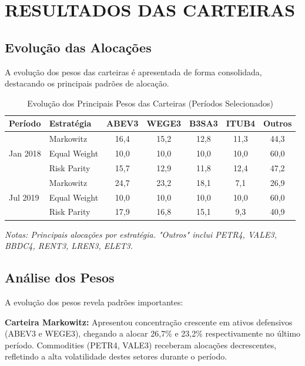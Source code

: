 \section{RESULTADOS DAS CARTEIRAS}

\subsection{Evolução das Alocações}

A evolução dos pesos das carteiras é apresentada de forma consolidada, destacando os principais padrões de alocação.

\begin{table}[H]
\centering
\caption{Evolução dos Principais Pesos das Carteiras (Períodos Selecionados)}
\scriptsize
\begin{tabular}{|l|l|c|c|c|c|c|}
\hline
\textbf{Período} & \textbf{Estratégia} & \textbf{ABEV3} & \textbf{WEGE3} & \textbf{B3SA3} & \textbf{ITUB4} & \textbf{Outros} \\
\hline
\multirow{3}{*}{Jan 2018} & Markowitz & 16,4 & 15,2 & 12,8 & 11,3 & 44,3 \\
\cline{2-7}
& Equal Weight & 10,0 & 10,0 & 10,0 & 10,0 & 60,0 \\
\cline{2-7}
& Risk Parity & 15,7 & 12,9 & 11,8 & 12,4 & 47,2 \\
\hline
\multirow{3}{*}{Jul 2019} & Markowitz & 24,7 & 23,2 & 18,1 & 7,1 & 26,9 \\
\cline{2-7}
& Equal Weight & 10,0 & 10,0 & 10,0 & 10,0 & 60,0 \\
\cline{2-7}
& Risk Parity & 17,9 & 16,8 & 15,1 & 9,3 & 40,9 \\
\hline
\end{tabular}
\normalsize
\textit{Notas: Principais alocações por estratégia. "Outros" inclui PETR4, VALE3, BBDC4, RENT3, LREN3, ELET3.}
\label{tab:portfolio_weights}
\end{table}

\subsection{Análise dos Pesos}

A evolução dos pesos revela padrões importantes:

\textbf{Carteira Markowitz:} Apresentou concentração crescente em ativos defensivos (ABEV3 e WEGE3), chegando a alocar 26,7\% e 23,2\% respectivamente no último período. Commodities (PETR4, VALE3) receberam alocações decrescentes, refletindo a alta volatilidade destes setores durante o período.

